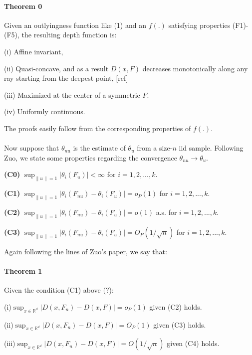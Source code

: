 \documentclass{article}
\begin{document}
\paragraph{Theorem 0} Given an outlyingness function like (1) and an $f(.)$ satisfying properties (F1)-(F5), the resulting depth function is:

(i) Affine invariant,

(ii) Quasi-concave, and as a result $D(x,F)$ decreases monotonically along any ray starting from the deepest point, [ref]

(iii) Maximized at the center of a symmetric $F$.

(iv) Uniformly continuous.
\vspace{.5cm}

The proofs easily follow from the corresponding properties of $f(.)$.

\paragraph{}Now suppose that $\theta_{nu}$ is the estimate of $\theta_u$ from a size-$n$ iid sample. Following Zuo, we state some properties regarding the convergence $\theta_{nu}\rightarrow\theta_u$.

\textbf{(C0)} $ \sup_{\|u\|=1} |\theta_i(F_u)| < \infty$ for $i=1,2,...,k$.

\textbf{(C1)} $ \sup_{\|u\|=1} |\theta_i(F_{nu})-\theta_i(F_u)| = o_P(1)$ for $i=1,2,...,k$.

\textbf{(C2)} $ \sup_{\|u\|=1} |\theta_i(F_{nu})-\theta_i(F_u)| = o(1)$ a.s. for $i=1,2,...,k$.

\textbf{(C3)} $ \sup_{\|u\|=1} |\theta_i(F_{nu})-\theta_i(F_u)| = O_P(1/\sqrt n)$ for $i=1,2,...,k$.
\vspace{.5cm}

Again following the lines of Zuo's paper, we say that:
\paragraph{Theorem 1} Given the condition (C1) above (?):

(i)$\sup_{x\in\mathbb{R}^d} |D(x,F_n)-D(x,F)|=o_P(1)$ given (C2) holds.

(ii)$\sup_{x\in\mathbb{R}^d} |D(x,F_n)-D(x,F)|=O_P(1)$ given (C3) holds.

(iii)$\sup_{x\in\mathbb{R}^d} |D(x,F_n)-D(x,F)|=O(1/ \sqrt n)$ given (C4) holds.
\end{document}
